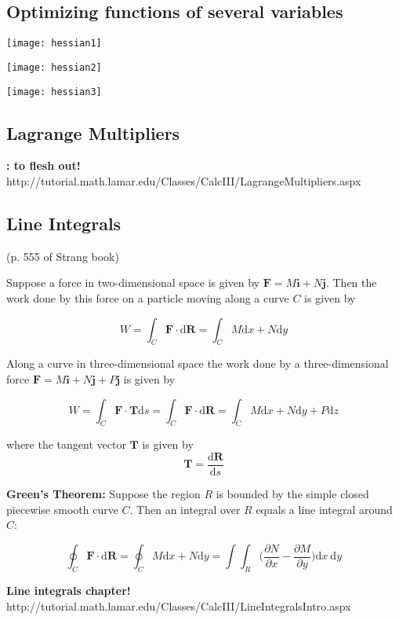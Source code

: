 \subsection{Optimizing functions of several variables}

\texttt{[image: hessian1]}

\texttt{[image: hessian2]}

\texttt{[image: hessian3]}

\subsection{Lagrange Multipliers} \textbf{: to flesh out!} http://tutorial.math.lamar.edu/Classes/CalcIII/LagrangeMultipliers.aspx

\subsection{Line Integrals} (p. 555 of Strang book)

Suppose a force in two-dimensional space is given by \(\boldsymbol{F} = M\boldsymbol{i} + N \boldsymbol{j}\). Then the work done by this force on a particle moving along a curve \(C\) is given by

\[
W = \int_C \boldsymbol{F} \cdot \text{d}\boldsymbol{R} = \int_C M \text{d}x + N \text{d} y
\]

Along a curve in three-dimensional space the work done by a three-dimensional force \(\boldsymbol{F} = M\boldsymbol{i} + N \boldsymbol{j} + P \boldsymbol{j}\) is given by

\[
W = \int_C \boldsymbol{F} \cdot \boldsymbol{T} \text{d}s = \int_C \boldsymbol{F} \cdot \text{d}\boldsymbol{R} = \int_C M \text{d}x + N \text{d}y + P \text{d}z
\]

where the tangent vector \(\boldsymbol{T}\) is given by \[\boldsymbol{T} = \frac{\text{d}\boldsymbol{R}}{\text{d}s}\]

\textbf{Green's Theorem:} Suppose the region \(R\) is bounded by the simple closed piecewise smooth curve \(C\). Then an integral over \(R\) equals a line integral around \(C\):

\[
\oint_C \boldsymbol{F} \cdot \text{d}\boldsymbol{R} = \oint_C M \text{d}x + N \text{d}y = \int \int_R \bigg( \frac{\partial N}{\partial x} - \frac{\partial M}{\partial y} \bigg) \text{d}x \ \text{d}y
\]

\textbf{Line integrals chapter!} http://tutorial.math.lamar.edu/Classes/CalcIII/LineIntegralsIntro.aspx

